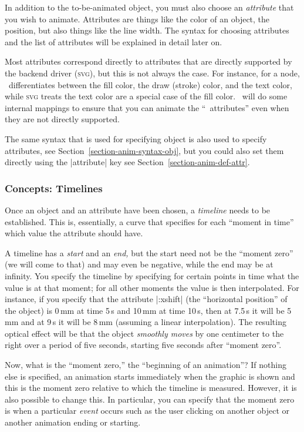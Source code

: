 In addition to the to-be-animated object, you must also choose an
\emph{attribute} that you wish to animate. Attributes are things like
the color of an object, the position, but also things like the line
width. The syntax for choosing attributes and the list of attributes
will be explained in detail later on.

Most attributes correspond directly to attributes that are directly
supported by the backend driver (\textsc{svg}), but this is not always
the case. For instance, for a node, \tikzname\ differentiates between
the fill color, the draw (stroke) color, and the text color, while
\textsc{svg} treats the text color are a special case of the fill
color. \tikzname\ will do some internal mappings to ensure that you
can animate the ``\tikzname\ attributes'' even when they are not
directly supported.

The same syntax that is used for specifying object is also used to
specify attributes, see Section~\ref{section-anim-syntax-obj}, but you
could also set them directly using the |attribute| key see
Section~\ref{section-anim-def-attr}. 

\subsubsection{Concepts: Timelines}

Once an object and an attribute have been chosen, a \emph{timeline}
needs to be established. This is, essentially, a curve that specifies
for each ``moment in time'' which value the attribute should have.

A timeline has a \emph{start} and an \emph{end,} but the start need
not be the ``moment zero'' (we will come to that) and may even be
negative, while the end may be at infinity. You specify the timeline
by specifying for certain points in time what the value is at that
moment; for all other moments the value is then interpolated. For
instance, if you specify that the attribute |:xshift| (the
``horizontal position'' of the object) is 0\,mm at time 5\,s and 10\,mm
at time 10\,s, then at 7.5\,s it will be 5\,mm and at 9\,s it will
be 8\,mm (assuming a linear interpolation). The resulting optical
effect will be that the object \emph{smoothly moves} by one centimeter
to the right over a period of five seconds, starting five seconds
after ``moment zero''.

Now, what is the ``moment zero,'' the ``beginning of an animation''? If
nothing else is specified, an animation starts immediately when the
graphic is shown and this is the moment zero relative to which the
timeline is measured. However, it is also possible to change this. In
particular, you can specify that the moment zero is when a particular
\emph{event} occurs such as the user clicking on another object or
another animation ending or starting.

